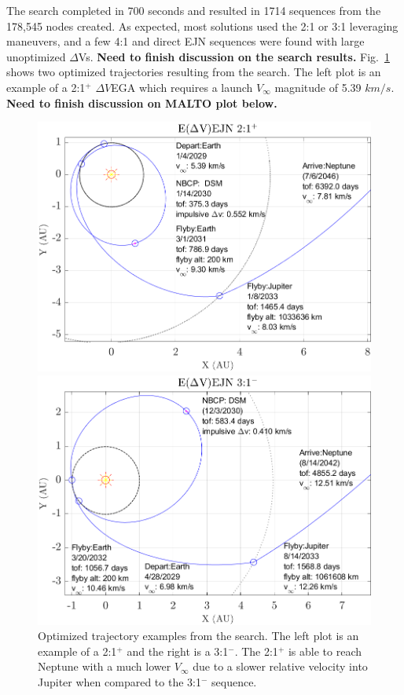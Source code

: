 \documentclass[letterpaper, preprint, paper,11pt]{AAS}	%
\begin{document}
The search completed in 700 seconds and resulted in 1714 sequences from the 178,545 nodes created. As expected, most solutions used the 2:1 or 3:1 leveraging maneuvers, and a few 4:1 and direct EJN sequences were found with large unoptimized $\Delta$Vs.
\textbf{Need to finish discussion on the search results.}
Fig.~\ref{fig:maltotriton} shows two optimized trajectories resulting from the search. The left plot is an example of a 2:1$^{+}$ $\Delta V$EGA which requires a launch $V_\infty$ magnitude of 5.39 $km/s$.
\textbf{Need to finish discussion on MALTO plot below.}
%
%
\begin{figure}[ht]
		\centering
		\begin{minipage}{0.50\textwidth}
				\centering
				\includegraphics[width=1.0\textwidth]{./fig/eejn21plus}
    \end{minipage}\hfill
		\begin{minipage}{0.50\textwidth}
				\centering
				\includegraphics[width=1.0\textwidth]{./fig/eejn31minus}
		\end{minipage}
		\caption{Optimized trajectory examples from the search. The left plot is an example of a 2:1$^{+}$ and the right is a 3:1$^{-}$. The 2:1$^{+}$ is able to reach Neptune with a much lower $V_\infty$ due to a slower relative velocity into Jupiter when compared to the 3:1$^{-}$ sequence.}
		\label{fig:maltotriton}
\end{figure}
\end{document}

